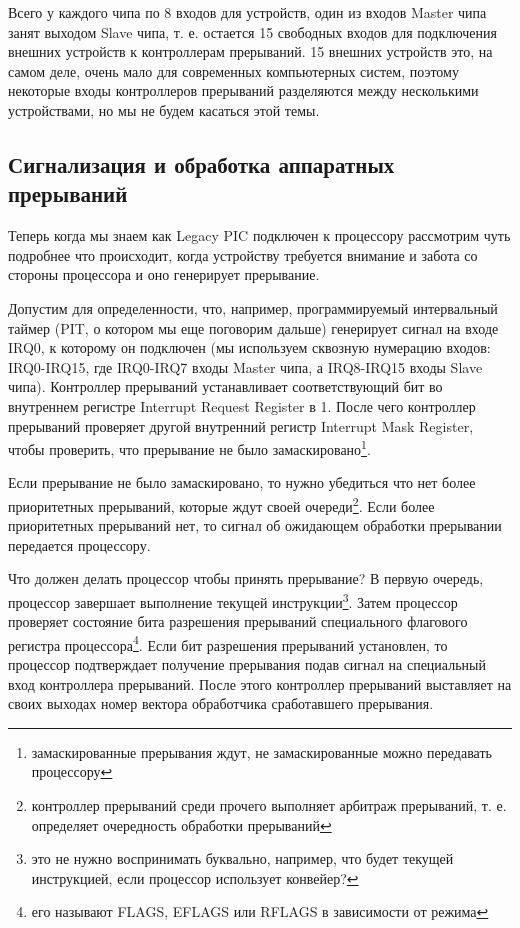 Всего у каждого чипа по 8 входов для устройств, один из входов Master чипа
занят выходом Slave чипа, т. е. остается 15 свободных входов для подключения
внешних устройств к контроллерам прерываний. 15 внешних устройств это, на самом
деле, очень мало для современных компьютерных систем, поэтому некоторые входы
контроллеров прерываний разделяются между несколькими устройствами, но мы не
будем касаться этой темы.

\subsection{Сигнализация и обработка аппаратных прерываний}

Теперь когда мы знаем как Legacy PIC подключен к процессору рассмотрим чуть
подробнее что происходит, когда устройству требуется внимание и забота со
стороны процессора и оно генерирует прерывание.

Допустим для определенности, что, например, программируемый интервальный таймер
(PIT, о котором мы еще поговорим дальше) генерирует сигнал на входе IRQ0, к
которому он подключен (мы используем сквозную нумерацию входов: IRQ0-IRQ15, где
IRQ0-IRQ7 входы Master чипа, а IRQ8-IRQ15 входы Slave чипа). Контроллер
прерываний устанавливает соответствующий бит во внутреннем регистре Interrupt
Request Register в 1. После чего контроллер прерываний проверяет другой
внутренний регистр Interrupt Mask Register, чтобы проверить, что прерывание не
было замаскировано\footnote{замаскированные прерывания ждут, не замаскированные
можно передавать процессору}.

Если прерывание не было замаскировано, то нужно убедиться что нет более
приоритетных прерываний, которые ждут своей очереди\footnote{контроллер
прерываний среди прочего выполняет арбитраж прерываний, т. е. определяет
очередность обработки прерываний}. Если более приоритетных прерываний нет, то
сигнал об ожидающем обработки прерывании передается процессору.

Что должен делать процессор чтобы принять прерывание? В первую очередь,
процессор завершает выполнение текущей инструкции\footnote{это не нужно
воспринимать буквально, например, что будет текущей инструкцией, если процессор
использует конвейер?}. Затем процессор проверяет состояние бита разрешения
прерываний специального флагового регистра процессора\footnote{его называют
FLAGS, EFLAGS или RFLAGS в зависимости от режима}. Если бит разрешения
прерываний установлен, то процессор подтверждает получение прерывания подав
сигнал на специальный вход контроллера прерываний. После этого контроллер
прерываний выставляет на своих выходах номер вектора обработчика сработавшего
прерывания.

